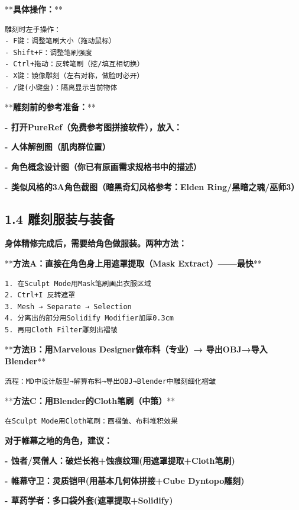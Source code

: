 \documentclass[12pt,a4paper,openany]{ctexbook}
\begin{document}
**\textbf{具体操作：}**


\begin{verbatim}
雕刻时左手操作：
- F键：调整笔刷大小（拖动鼠标）
- Shift+F：调整笔刷强度
- Ctrl+拖动：反转笔刷（挖/填互相切换）
- X键：镜像雕刻（左右对称，做脸时必开）
- /键(小键盘)：隔离显示当前物体
\end{verbatim}


**\textbf{雕刻前的参考准备：}**

\textbf{- 打开PureRef（免费参考图拼接软件），放入：}

\textbf{- 人体解剖图（肌肉群位置）}

\textbf{- 角色概念设计图（你已有原画需求规格书中的描述）}

\textbf{- 类似风格的3A角色截图（暗黑奇幻风格参考：Elden Ring/黑暗之魂/巫师3）}


\subsection*{1.4 雕刻服装与装备}


\textbf{身体精修完成后，需要给角色做服装。两种方法：}


**\textbf{方法A：直接在角色身上用遮罩提取（Mask Extract）——最快}**

\begin{verbatim}
1. 在Sculpt Mode用Mask笔刷画出衣服区域
2. Ctrl+I 反转遮罩
3. Mesh → Separate → Selection
4. 分离出的部分用Solidify Modifier加厚0.3cm
5. 再用Cloth Filter雕刻出褶皱
\end{verbatim}


**\textbf{方法B：用Marvelous Designer做布料（专业）→ 导出OBJ→导入Blender}**

\begin{verbatim}
流程：MD中设计版型→解算布料→导出OBJ→Blender中雕刻细化褶皱
\end{verbatim}


**\textbf{方法C：用Blender的Cloth笔刷（中策）}**

\begin{verbatim}
在Sculpt Mode用Cloth笔刷：画褶皱、布料堆积效果
\end{verbatim}


\textbf{对于帷幕之地的角色，建议：}

\textbf{- 蚀者/冥僧人：破烂长袍+蚀痕纹理(用遮罩提取+Cloth笔刷)}

\textbf{- 帷幕守卫：灵质铠甲(用基本几何体拼接+Cube Dyntopo雕刻)}

\textbf{- 草药学者：多口袋外套(遮罩提取+Solidify)}
\end{document}
